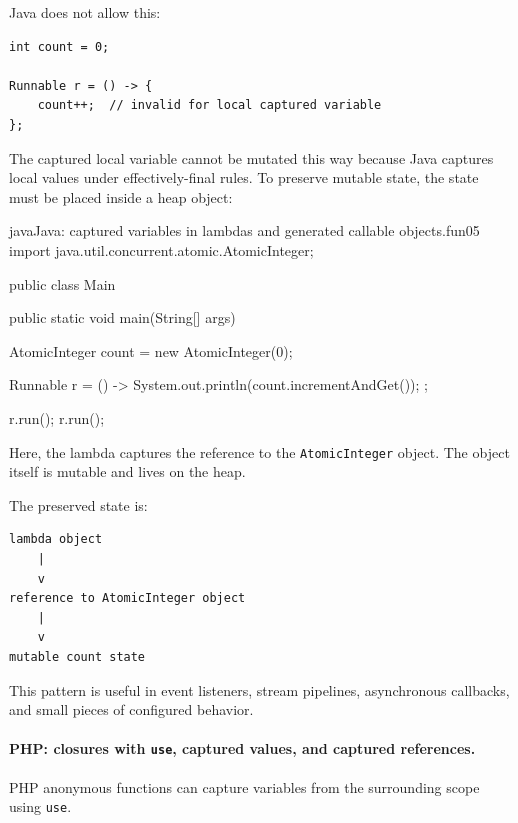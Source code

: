 Java does not allow this:

\begin{verbatim}
int count = 0;

Runnable r = () -> {
    count++;  // invalid for local captured variable
};
\end{verbatim}

The captured local variable cannot be mutated this way because Java captures local values under effectively-final rules. To preserve mutable state, the state must be placed inside a heap object:

\begin{codebox}[]{java}{Java: captured variables in lambdas and generated callable objects.}{fun05}
import java.util.concurrent.atomic.AtomicInteger;

public class Main {
    public static void main(String[] args) {
        AtomicInteger count = new AtomicInteger(0);

        Runnable r = () -> {
            System.out.println(count.incrementAndGet());
        };

        r.run();
        r.run();
    }
}
\end{codebox}


Here, the lambda captures the reference to the \texttt{AtomicInteger} object. The object itself is mutable and lives on the heap.

The preserved state is:

\begin{verbatim}
lambda object
    |
    v
reference to AtomicInteger object
    |
    v
mutable count state
\end{verbatim}

This pattern is useful in event listeners, stream pipelines, asynchronous callbacks, and small pieces of configured behavior.

\paragraph{PHP: closures with \texttt{use}, captured values, and captured references.}

PHP anonymous functions can capture variables from the surrounding scope using \texttt{use}.



